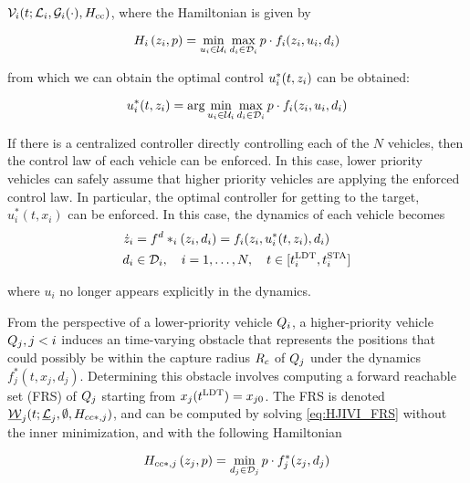 $\mathcal{V}_i(t; \mathcal{L}_i, \mathcal{G}_i(\cdot), H_{\text{cc}})$, where the Hamiltonian is given by

\begin{equation}
H_i\left(z_i, p\right) = \min_{u_i \in \mathcal{U}_i} \max_{d_i \in \mathcal{D}_i} p \cdot f_i(z_i, u_i, d_i)
\end{equation}

\noindent from which we can obtain the optimal control $u_i^*(t, z_i)$ can be obtained:

\begin{equation}
\label{eq:opt_ctrl_i}
\ctrl_i^*(t, \state_i) =  \arg \min_{\ctrl_i \in \cset_i} \max_{\dstb_i \in \dset_i} p \cdot \fdyn_i(\state_i, \ctrl_i, \dstb_i)
\end{equation}

If there is a centralized controller directly controlling each of the $N$ vehicles, then the control law of each vehicle can be enforced. In this case, lower priority vehicles can safely assume that higher priority vehicles are applying the enforced control law. In particular, the optimal controller for getting to the target, $u^*_i(t, x_i)$ can be enforced. In this case, the dynamics of each vehicle becomes 
\vspace{-0.3em}
\begin{equation}
\label{eq:dyn_cc}
\begin{aligned}
\dot \state_i &= \fdyn^\dstb*_i (\state_i, \dstb_i) = \fdyn_i(\state_i, \ctrl^*_i(t, \state_i), \dstb_i) \\
\dstb_i &\in \dset_i, \quad i = 1,\ldots, N, \quad t \in [\ldt_i, \sta_i]
\end{aligned}
\end{equation}

\noindent where $u_i$ no longer appears explicitly in the dynamics.

From the perspective of a lower-priority vehicle $Q_{i}$, a higher-priority vehicle $Q_{j}, j < i$ induces an time-varying obstacle that represents the positions that could possibly be within the capture radius $R_c$ of $Q_{j}$ under the dynamics $f^*_j(t, x_j, d_j)$. Determining this obstacle involves computing a forward reachable set (FRS) of $Q_{j}$ starting from $x_j(t^\text{LDT}) = x_{j0}$. The FRS is denoted $\underline{\mathcal{W}}_j(t; \underline{\mathcal{L}}_j, \emptyset, H_{cc*,j})$, and can be computed by solving \eqref{eq:HJIVI_FRS} without the inner minimization, and with the following Hamiltonian

\begin{equation}
H_{cc*,j}\left(z_j, p\right) = \min_{d_j \in \mathcal{D}_j} p \cdot f^*_j(z_j, d_j)
\end{equation}

